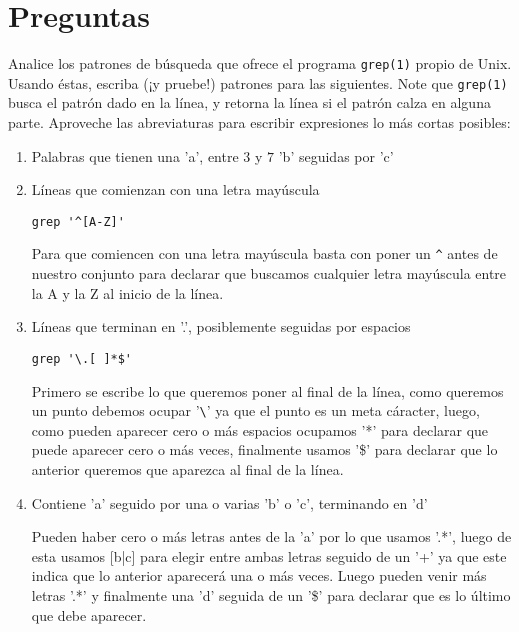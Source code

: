 \documentclass[spanish, fleqn]{article}
\title{Informática Teórica\\
       Tarea \#\num \\
       ``¡Precalentamiento!''}
\author{Andrés Navarro \\ 201673001-K}
\date{4 de septiembre de 2017}
\begin{document}
\maketitle
\thispagestyle{empty}

\section*{Preguntas}

  Analice los patrones de búsqueda que ofrece el programa \texttt{grep(1)}
  propio de Unix.
  Usando éstas,
  escriba
  (¡y pruebe!)
  patrones para las siguientes.
  Note que \texttt{grep(1)} busca el patrón dado en la línea,
  y retorna la línea si el patrón calza en alguna parte.
  Aproveche las abreviaturas para escribir expresiones
  lo más cortas posibles:
  \begin{enumerate}
  \item
    Palabras que tienen una 'a', entre \(3\) y \(7\) 'b' seguidas por 'c'
  \item
    Líneas que comienzan con una letra mayúscula
    
    \verb+grep '^[A-Z]'+
    
    Para que comiencen con una letra mayúscula basta con poner un \verb+^+ antes de nuestro conjunto para declarar que buscamos cualquier letra mayúscula entre la A y la Z al inicio de la línea.
    
  \item
    Líneas que terminan en '.',
    posiblemente seguidas por espacios
    
    \verb+grep '\.[ ]*$'+
    
    Primero se escribe lo que queremos poner al final de la línea, como queremos un punto debemos ocupar '\verb+\+'  ya que el punto es un meta cáracter, luego, como pueden aparecer cero o más espacios ocupamos  '*'  para declarar que puede aparecer cero o más veces, finalmente usamos '\$' para declarar que lo anterior queremos que aparezca al final de la línea.
  
  \item
    Contiene 'a' seguido por una o varias 'b' o 'c',
    terminando en 'd'
    
    
    Pueden haber cero o más letras antes de la 'a' por lo que usamos '.*', luego de esta usamos [b|c] para elegir entre ambas letras seguido de un '+' ya que este indica que lo anterior aparecerá una o más veces. Luego pueden venir más letras '.*' y finalmente una 'd' seguida de un '\$' para declarar que es lo último que debe aparecer.
    

\end{enumerate}
\end{document}
